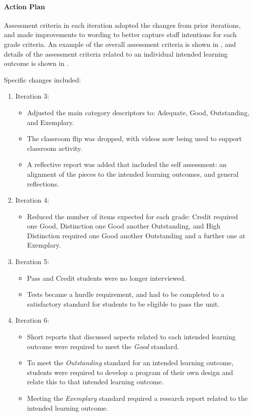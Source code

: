 
\paragraph{Action Plan} %
\label{ssub:plan_3_6}

Assessment criteria in each iteration adopted the changes from prior iterations, and made improvements to wording to better capture staff intentions for each grade criteria. An example of the overall assessment criteria is shown in , and details of the assessment criteria related to an individual intended learning outcome is shown in .

Specific changes included: 
\begin{enumerate}
  \item Iteration 3:
  \begin{itemize}[noitemsep,nolistsep]
    \item Adjusted the main category descriptors to: Adequate, Good, Outstanding, and Exemplary.
    \item The classroom flip was dropped, with videos now being used to support classroom activity.
    \item A reflective report was added that included the self assessment: an alignment of the pieces to the intended learning outcomes, and general reflections.
  \end{itemize}
  \item Iteration 4:
  \begin{itemize}[noitemsep,nolistsep]
    \item Reduced the number of items expected for each grade: Credit required one Good, Distinction one Good another Outstanding, and High Distinction required one Good another Outstanding and a further one at Exemplary.
  \end{itemize}
  \item Iteration 5:
  \begin{itemize}[noitemsep,nolistsep]
    \item Pass and Credit students were no longer interviewed.
    \item Tests became a hurdle requirement, and had to be completed to a satisfactory standard for students to be eligible to pass the unit.
  \end{itemize}
  \item Iteration 6:
  \begin{itemize}[noitemsep,nolistsep]
  	\item Short reports that discussed aspects related to each intended learning outcome were required to meet the \emph{Good} standard.
    \item To meet the \emph{Outstanding} standard for an intended learning outcome, students were required to develop a program of their own design and relate this to that intended learning outcome.
    \item Meeting the \emph{Exemplary} standard required a research report related to the intended learning outcome. 
  \end{itemize}
\end{enumerate}


